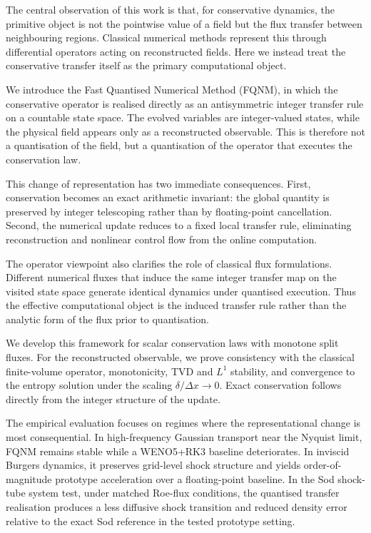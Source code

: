 \documentclass[sn-basic]{sn-jnl}
\theoremstyle{plain}
\theoremstyle{remark}
\begin{document}
The central observation of this work is that, for conservative dynamics, the primitive object is not the pointwise value of a field but the flux transfer between neighbouring regions. Classical numerical methods represent this through differential operators acting on reconstructed fields. Here we instead treat the conservative transfer itself as the primary computational object.

We introduce the Fast Quantised Numerical Method (FQNM), in which the conservative operator is realised directly as an antisymmetric integer transfer rule on a countable state space. The evolved variables are integer-valued states, while the physical field appears only as a reconstructed observable. This is therefore not a quantisation of the field, but a quantisation of the operator that executes the conservation law.

This change of representation has two immediate consequences. First, conservation becomes an exact arithmetic invariant: the global quantity is preserved by integer telescoping rather than by floating-point cancellation. Second, the numerical update reduces to a fixed local transfer rule, eliminating reconstruction and nonlinear control flow from the online computation.

The operator viewpoint also clarifies the role of classical flux formulations. Different numerical fluxes that induce the same integer transfer map on the visited state space generate identical dynamics under quantised execution. Thus the effective computational object is the induced transfer rule rather than the analytic form of the flux prior to quantisation.

We develop this framework for scalar conservation laws with monotone split fluxes. For the reconstructed observable, we prove consistency with the classical finite-volume operator, monotonicity, TVD and \(L^1\) stability, and convergence to the entropy solution under the scaling \(\delta/\Delta x \to 0\). Exact conservation follows directly from the integer structure of the update.

The empirical evaluation focuses on regimes where the representational change is most consequential. In high-frequency Gaussian transport near the Nyquist limit, FQNM remains stable while a WENO5+RK3 baseline deteriorates. In inviscid Burgers dynamics, it preserves grid-level shock structure and yields order-of-magnitude prototype acceleration over a floating-point baseline. In the Sod shock-tube system test, under matched Roe-flux conditions, the quantised transfer realisation produces a less diffusive shock transition and reduced density error relative to the exact Sod reference in the tested prototype setting.
\end{document}
